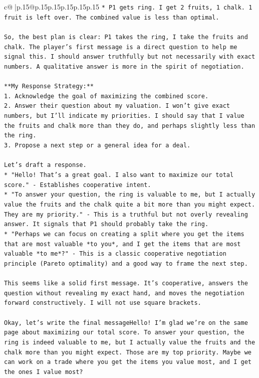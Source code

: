 \documentclass{article}
\begin{document}
{\begin{supertabular}{c@{$\;$}|p{.15\linewidth}@{}p{.15\linewidth}p{.15\linewidth}p{.15\linewidth}p{.15\linewidth}p{.15\linewidth}}
{{{\texttt{*   P1 gets ring. I get 2 fruits, 1 chalk. 1 fruit is left over. The combined value is less than optimal.} \\
\\ 
\texttt{So, the best plan is clear: P1 takes the ring, I take the fruits and chalk. The player's first message is a direct question to help me signal this. I should answer truthfully but not necessarily with exact numbers. A qualitative answer is more in the spirit of negotiation.} \\
\\ 
\texttt{**My Response Strategy:**} \\
\texttt{1.  Acknowledge the goal of maximizing the combined score.} \\
\texttt{2.  Answer their question about my valuation. I won't give exact numbers, but I'll indicate my priorities. I should say that I value the fruits and chalk more than they do, and perhaps slightly less than the ring.} \\
\texttt{3.  Propose a next step or a general idea for a deal.} \\
\\ 
\texttt{Let's draft a response.} \\
\texttt{*   "Hello! That's a great goal. I also want to maximize our total score." {-} Establishes cooperative intent.} \\
\texttt{*   "To answer your question, the ring is valuable to me, but I actually value the fruits and the chalk quite a bit more than you might expect. They are my priority." {-} This is a truthful but not overly revealing answer. It signals that P1 should probably take the ring.} \\
\texttt{*   "Perhaps we can focus on creating a split where you get the items that are most valuable *to you*, and I get the items that are most valuable *to me*?" {-} This is a classic cooperative negotiation principle (Pareto optimality) and a good way to frame the next step.} \\
\\ 
\texttt{This seems like a solid first message. It's cooperative, answers the question without revealing my exact hand, and moves the negotiation forward constructively. I will not use square brackets.} \\
\\ 
\texttt{Okay, let's write the final messageHello! I'm glad we're on the same page about maximizing our total score. To answer your question, the ring is indeed valuable to me, but I actually value the fruits and the chalk more than you might expect. Those are my top priority. Maybe we can work on a trade where you get the items you value most, and I get the ones I value most?} \\
            }
        }
    }
     \\ \\


\end{supertabular}}
\end{document}
